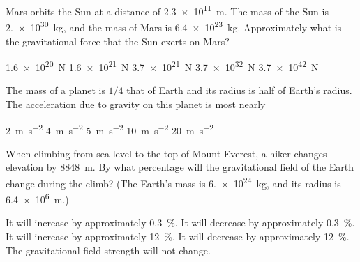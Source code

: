 \documentclass{../../oss-classkick-exam}
\begin{document}
\begin{multicols*}{2}
\begin{questions}
    \question Mars orbits the Sun at a distance of \SI{2.3e11}{\metre}. The
    mass of the Sun is \SI{2.e30}{\kilo\gram}, and the mass of Mars is
    \SI{6.4e23}{\kilo\gram}. Approximately what is the gravitational force that
    the Sun exerts on Mars?
    \begin{choices}
      \choice\SI{1.6e20}{\newton}
      \choice\SI{1.6e21}{\newton}
      \choice\SI{3.7e21}{\newton}
      \choice\SI{3.7e32}{\newton}
      \choice\SI{3.7e42}{\newton}
    \end{choices}

    \question The mass of a planet is $1/4$ that of Earth and its radius is
    half of Earth's radius. The acceleration due to gravity on this planet is
    most nearly
    \begin{choices}
      \choice\SI{2}{\metre\per\second\squared}
      \choice\SI{4}{\metre\per\second\squared}
      \choice\SI{5}{\metre\per\second\squared}
      \choice\SI{10}{\metre\per\second\squared}
      \choice\SI{20}{\metre\per\second\squared}
    \end{choices}
    
    \question When climbing from sea level to the top of Mount Everest, a hiker
    changes elevation by \SI{8848}{\metre}. By what percentage will the
    gravitational field of the Earth change during the climb? (The Earth's
    mass is \SI{6.e24}{\kilo\gram}, and its radius is \SI{6.4e6}{\metre}.)
    \begin{choices}
      \choice It will increase by approximately \SI{.3}{\percent}.
      \choice It will decrease by approximately \SI{.3}{\percent}.
      \choice It will increase by approximately \SI{12}{\percent}.
      \choice It will decrease by approximately \SI{12}{\percent}.
      \choice The gravitational field strength will not change.
    \end{choices}
    \vspace{.7in}
    

\end{questions}
\end{multicols*}
\end{document}
